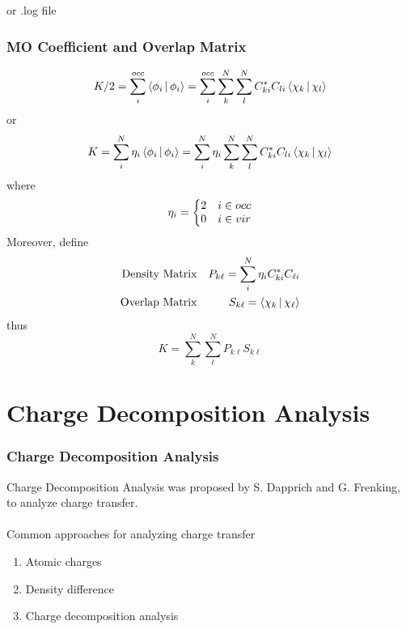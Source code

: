 \documentclass[10pt,aspectratio=43]{beamer}
\newcommand{\code}[1]{\colorbox{codegray}{{\Consolas#1}}}
\numberwithin{equation}{section}
\begin{document}
\begin{frame}
or \code{.log} file
\makeset
\end{frame}

\begin{frame}
\frametitle{MO Coefficient and Overlap Matrix}
\begin{equation}\label{key}
K/2 = \sum_i^{occ}\Braket{\phi_i | \phi_i} = \sum_i^{occ} \sum_k^N\sum_l^N C_{ki}^*C_{li} \Braket{\chi_k | \chi_l}
\end{equation}
or
\begin{align}\label{key}
K = \sum_i^N \eta_i\Braket{\phi_i | \phi_i} = \sum_i^N \eta_i \sum_k^N\sum_l^N C_{ki}^*C_{li} \Braket{\chi_k | \chi_l} 
\end{align}
where 
\begin{equation}\label{key}
\eta_i = 
\left\{
\mqty{2 & i\in occ\\ 0 & i\in vir}
\right.
\end{equation}
Moreover, define
\begin{align}
\text{Density Matrix} & & P_{k\ell} = \sum_i^N \eta_i C_{ki}^* C_{\ell i} \\
\text{Overlap Matrix} & & S_{k\ell} = \Braket{\chi_k | \chi_\ell}
\end{align}
thus
\begin{equation}\label{key}
K = \sum_k^N \sum_\ell^N P_{k\ell} S_{k\ell}
\end{equation}

\end{frame}

\section{Charge Decomposition Analysis}
\begin{frame}
\frametitle{Charge Decomposition Analysis}
Charge Decomposition Analysis was proposed by S. Dapprich and G. Frenking, to analyze charge transfer.\\
\hfill {}
~\vspace{40pt}\\
Common approaches for analyzing charge transfer
\begin{enumerate}
	\item Atomic charges
	\item Density difference
	\item Charge decomposition analysis
\end{enumerate}
\end{frame}
\end{document}
